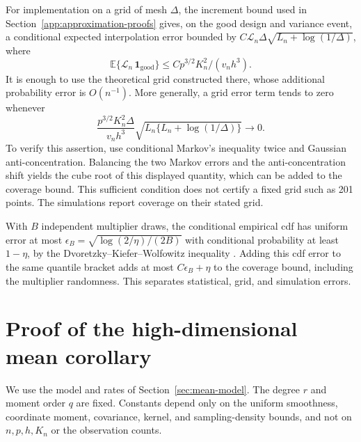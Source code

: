 \documentclass[10pt]{book}
\newcommand{\expect}{\mathbb{E}}
\numberwithin{equation}{section}
\begin{document}
For implementation on a grid of mesh $\Delta$, the increment bound used in
Section~\ref{app:approximation-proofs} gives, on the good design and variance
event, a conditional expected interpolation error bounded by
$C\mathcal L_n\Delta\sqrt{L_n+\log(1/\Delta)}$, where
\[
\expect\{\mathcal L_n\,\mathbf1_{\mathrm{good}}\}
\le C p^{3/2}K_n^2/(v_nh^3).
\]
It is enough to use the theoretical grid constructed there, whose
additional probability error is $O(n^{-1})$. More generally, a grid error
term tends to zero whenever
\[
\frac{p^{3/2}K_n^2\Delta}{v_nh^3}
\sqrt{L_n\{L_n+\log(1/\Delta)\}}\to0.
\]
To verify this assertion, use conditional Markov's inequality twice and
Gaussian anti-concentration. Balancing the two Markov errors and the
anti-concentration shift yields the cube root of this displayed quantity,
which can be added to the coverage bound.
This sufficient condition does not certify a fixed grid such as 201
points. The simulations report coverage on their stated grid.

With $B$ independent multiplier draws, the conditional empirical cdf has
uniform error at most $\epsilon_B=\sqrt{\log(2/\eta)/(2B)}$ with conditional
probability at least $1-\eta$, by the Dvoretzky--Kiefer--Wolfowitz inequality
\citep{massart_dkw_1990}. Adding this cdf error to the same quantile bracket
adds at most $C\epsilon_B+\eta$ to the coverage bound, including the
multiplier randomness. This separates statistical, grid, and simulation errors.


\section{Proof of the high-dimensional mean corollary}
\label{app:highd-mean}

We use the model and rates of Section~\ref{sec:mean-model}. The degree
$r$ and moment order $q$ are fixed. Constants depend only on the
uniform smoothness, coordinate moment, covariance, kernel, and
sampling-density bounds, and not on $n,p,h,K_n$ or the observation counts.
\end{document}
